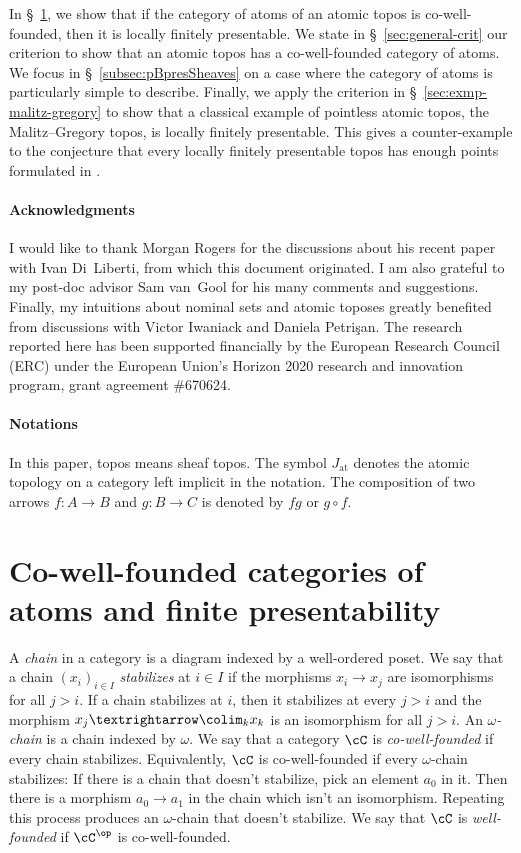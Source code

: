 \documentclass[numberwithin=section]{papier}
\newcommand{\at}{\mathrm{at}}
\begin{document}
In §~\ref{sec:well-founded}, we show that if the category of atoms of an atomic topos is co-well-founded, then it is locally finitely presentable. We state in §~\ref{sec:general-crit} our criterion to show that an atomic topos has a co-well-founded category of atoms. We focus in §~\ref{subsec:pBpresSheaves} on a case where the category of atoms is particularly simple to describe. Finally, we apply the criterion in §~\ref{sec:exmp-malitz-gregory} to show that a classical example of pointless atomic topos, the Malitz--Gregory topos, is locally finitely presentable. This gives a counter-example to the conjecture that every locally finitely presentable topos has enough points formulated in \cite{dilibertiTopoiEnoughPoints2024}.

\paragraph{Acknowledgments} I would like to thank Morgan Rogers for the discussions about his recent paper \cite{dilibertiTopoiEnoughPoints2024} with Ivan Di~Liberti, from which this document originated. I am also grateful to my post-doc advisor Sam van~Gool for his many comments and suggestions. Finally, my intuitions about nominal sets and atomic toposes greatly benefited from discussions with Victor Iwaniack and Daniela Petrişan. The research reported here has been supported financially by the European Research Council (ERC) under the European Union's Horizon 2020 research and innovation program, grant agreement \#670624.

\paragraph{Notations} In this paper, topos means sheaf topos. The symbol $J_\at$ denotes the atomic topology on a category left implicit in the notation. The composition of two arrows $f : A→B$ and $g : B→C$ is denoted by $fg$ or $g∘f$.

\section{Co-well-founded categories of atoms and finite presentability}
\label{sec:well-founded}

A \emph{chain} in a category is a diagram indexed by a well-ordered poset. We say that a chain $(x_i)_{i∈I}$ \emph{stabilizes} at $i∈I$ if the morphisms $x_i→x_j$ are isomorphisms for all $j > i$. If a chain stabilizes at $i$, then it stabilizes at every $j > i$ and the morphism $x_j → \colim_k x_k$ is an isomorphism for all $j > i$. An \emph{$ω$-chain} is a chain indexed by $ω$. We say that a category $\cC$ is \emph{co-well-founded} if every chain stabilizes. Equivalently, $\cC$ is co-well-founded if every $ω$-chain stabilizes: If there is a chain that doesn't stabilize, pick an element $a_0$ in it. Then there is a morphism $a_0 → a_1$ in the chain which isn't an isomorphism. Repeating this process produces an $ω$-chain that doesn't stabilize. We say that $\cC$ is \emph{well-founded} if $\cC^\op$ is co-well-founded.
\end{document}
